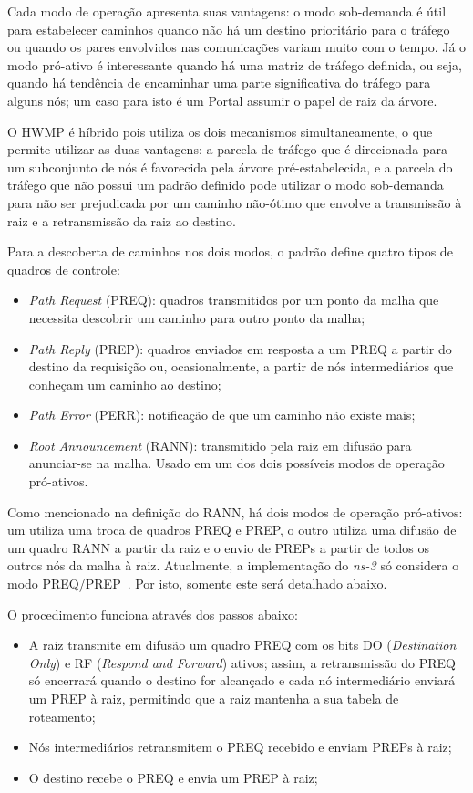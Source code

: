 \documentclass[letterpaper, 10 pt, conference]{ieeeconf}  %
\begin{document}
Cada modo de operação apresenta suas vantagens: o modo sob-demanda é útil para estabelecer caminhos quando não há um destino prioritário para o tráfego ou quando os pares envolvidos nas comunicações variam muito com o tempo. Já o modo pró-ativo é interessante quando há uma matriz de tráfego definida, ou seja, quando há tendência de encaminhar uma parte significativa do tráfego para alguns nós; um caso para isto é um Portal assumir o papel de raiz da árvore.

O HWMP é híbrido pois utiliza os dois mecanismos simultaneamente, o que permite utilizar as duas vantagens: a parcela de tráfego que é direcionada para um subconjunto de nós é favorecida pela árvore pré-estabelecida, e a parcela do tráfego que não possui um padrão definido pode utilizar o modo sob-demanda para não ser prejudicada por um caminho não-ótimo que envolve a transmissão à raiz e a retransmissão da raiz ao destino.

Para a descoberta de caminhos nos dois modos, o padrão define quatro tipos de quadros de controle:

\begin{itemize}
	\item \textit{Path Request} (PREQ): quadros transmitidos por um ponto da malha que necessita descobrir um caminho para outro ponto da malha;
    \item \textit{Path Reply} (PREP): quadros enviados em resposta a um PREQ a partir do destino da requisição ou, ocasionalmente, a partir de nós intermediários que conheçam um caminho ao destino;
    \item \textit{Path Error} (PERR): notificação de que um caminho não existe mais;
    \item \textit{Root Announcement} (RANN): transmitido pela raiz em difusão para anunciar-se na malha. Usado em um dos dois possíveis modos de operação pró-ativos.
\end{itemize}

Como mencionado na definição do RANN, há dois modos de operação pró-ativos: um utiliza uma troca de quadros PREQ e PREP, o outro utiliza uma difusão de um quadro RANN a partir da raiz e o envio de PREPs a partir de todos os outros nós da malha à raiz. Atualmente, a implementação do \textit{ns-3} só considera o modo PREQ/PREP~\cite{andreevsite}. Por isto, somente este será detalhado abaixo.

O procedimento funciona através dos passos abaixo:

\begin{itemize}
	\item A raiz transmite em difusão um quadro PREQ com os bits DO (\textit{Destination Only}) e RF (\textit{Respond and Forward}) ativos; assim, a retransmissão do PREQ só encerrará quando o destino for alcançado e cada nó intermediário enviará um PREP à raiz, permitindo que a raiz mantenha a sua tabela de roteamento;
    \item Nós intermediários retransmitem o PREQ recebido e enviam PREPs à raiz;
    \item O destino recebe o PREQ e envia um PREP à raiz;
\end{itemize}
\end{document}

